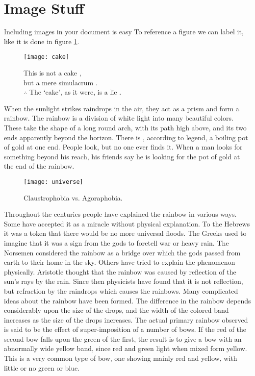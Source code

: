 \section{Image Stuff}

Including images in your document is easy 
To reference a figure we can label it, like it is done in figure \ref{fig:cake}.
\begin{figure}[H]
	\centering
	\texttt{[image: cake]}
	\captionsetup{justification=centering}
	\caption{
		This is not a cake \cite{magritte}, \\
		but a mere simulacrum \cite{beaudrillard}. \\
		$\therefore$ The `cake', as it were, is a lie \cite{rattman}.
	}
	\label{fig:cake}
\end{figure}

When the sunlight strikes raindrops in the air, they act as a prism and form a rainbow. The rainbow is a division of white light into many beautiful colors. These take the shape of a long round arch, with its path high above, and its two ends apparently beyond the horizon. There is , according to legend, a boiling pot of gold at one end. People look, but no one ever finds it. When a man looks for something beyond his reach, his friends say he is looking for the pot of gold at the end of the rainbow.
\begin{wrapfigure}{r}{6cm}
	\centering
	\texttt{[image: universe]}
	\caption*{\small Claustrophobia vs. Agoraphobia.}
\end{wrapfigure}
Throughout the centuries people have explained the rainbow in various ways. Some have accepted it as a miracle without physical explanation. To the Hebrews it was a token that there would be no more universal floods. The Greeks used to imagine that it was a sign from the gods to foretell war or heavy rain. The Norsemen considered the rainbow as a bridge over which the gods passed from earth to their home in the sky. Others have tried to explain the phenomenon physically. Aristotle thought that the rainbow was caused by reflection of the sun’s rays by the rain. Since then physicists have found that it is not reflection, but refraction by the raindrops which causes the rainbows. Many complicated ideas about the rainbow have been formed. The difference in the rainbow depends considerably upon the size of the drops, and the width of the colored band increases as the size of the drops increases. The actual primary rainbow observed is said to be the effect of super-imposition of a number of bows. If the red of the second bow falls upon the green of the first, the result is to give a bow with an abnormally wide yellow band, since red and green light when mixed form yellow. This is a very common type of bow, one showing mainly red and yellow, with little or no green or blue. %

